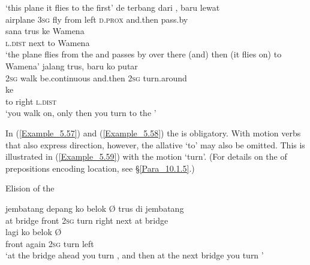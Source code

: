 \glt 
‘this plane it flies to the  first’ \textstyleExampleSource{[Elicited BR130103.014]}
\z
\ea
\label{Example_5.57}
 {{de}} {{terbang}} {dari} {} {,} {baru} {lewat}\\ %
 {airplane}  {\textsc{3sg}}  {fly}  from  left  \textsc{d.prox}  and.then  pass.by\\
 \gll sana  {trus}  {ke}  {Wamena}\\
 \textsc{l.dist}  {next}  {to}  {Wamena}\\
\glt 
‘the plane flies from the  and passes by over there (and) then (it flies on) to Wamena’ \textstyleExampleSource{[Elicited BR130103.022]}
\z
\ea
\label{Example_5.58}
 {jalang} {{trus,}} {baru} {ko} {putar}\\ %
 {\textsc{2sg}}  walk  {be.continuous}  and.then  \textsc{2sg}  turn.around\\
\gll  ke  {}  {}\\
 to  {right}  {\textsc{l.dist}}\\
\glt 
‘you walk on, only then you turn to the ’ \textstyleExampleSource{[Elicited BR130103.005]}
\z


In (\ref{Example_5.57}) and (\ref{Example_5.58}) the  is obligatory. With motion verbs that also express direction, however, the allative   ‘to’ may also be omitted. This is illustrated in (\ref{Example_5.59}) with the motion   ‘turn’. (For details on the  of prepositions encoding location, see §\ref{Para_10.1.5}.)


\begin{styleExampleTitle}
Elision of the 
\end{styleExampleTitle}

\ea
\label{Example_5.59}
 {{jembatang}} {{depang}} {{ko}} {{belok}} {Ø} {} {trus} {di} {jembatang}\\ %
 at  {bridge}  {front}  {\textsc{2sg}}  {turn} {}   right  next  at  bridge\\
  lagi  ko  {belok}  {Ø}  {}\\
 {front}  again  \textsc{2sg}  {turn}  {}  {left}\\
\glt 
‘at the bridge ahead you turn , and then at the next bridge you turn ’ \textstyleExampleSource{[Elicited BR130103.002]}
\z



